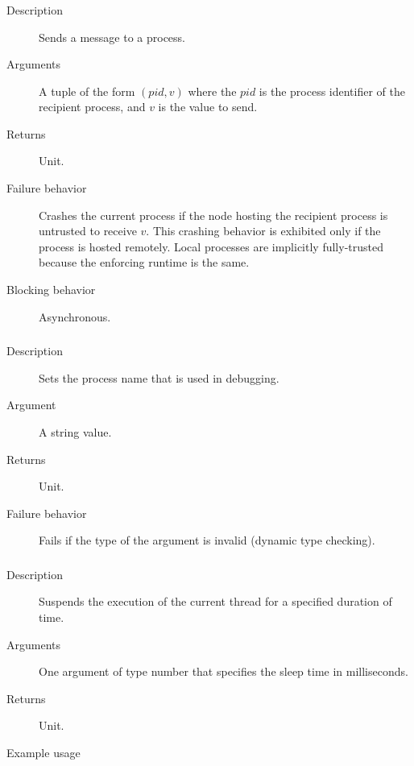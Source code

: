 \subsubsection{}
\begin{description}
    \item [Description] Sends a message to a process.
    \item [Arguments] A tuple of the form $(\mathit{pid}, v)$ where the $\mathit{pid}$ is the process identifier 
of the recipient process, and $v$ is the value to send.
    \item [Returns] Unit.
    \item [Failure behavior] Crashes the current process if the node hosting the recipient process is untrusted to receive $v$.
This crashing behavior is exhibited only if the process is hosted remotely. Local processes are implicitly fully-trusted because the 
enforcing runtime is the same.
    \item [Blocking behavior] Asynchronous.
\end{description}


\subsubsection{}
\begin{description}
    \item [Description] Sets the process name that is used in debugging.
    \item [Argument] A string value.
    \item [Returns] Unit.
    \item [Failure behavior] Fails if the type of the argument is invalid (dynamic type checking).
\end{description}



\subsubsection{}

\begin{description}
    \item [Description] Suspends the execution of the current thread for a specified duration of time.  
    \item [Arguments] One argument of type number that specifies the sleep time in milliseconds.
    \item [Returns] Unit.
    \item [Example usage] 
\end{description}



